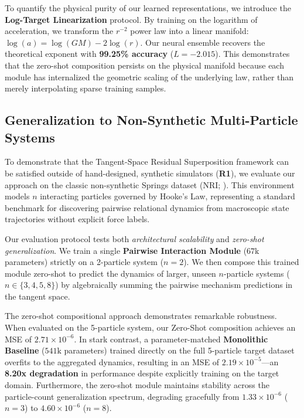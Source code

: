 \documentclass[twoside,11pt]{article}
\begin{document}
To quantify the physical purity of our learned representations, we introduce the \textbf{Log-Target Linearization} protocol. By training on the logarithm of acceleration, we transform the $r^{-2}$ power law into a linear manifold: $\log(a) = \log(GM) - 2\log(r)$. Our neural ensemble recovers the theoretical exponent with \textbf{99.25\% accuracy} ($L = -2.015$). This demonstrates that the zero-shot composition persists on the physical manifold because each module has internalized the geometric scaling of the underlying law, rather than merely interpolating sparse training samples.

\subsection{Generalization to Non-Synthetic Multi-Particle Systems}
To demonstrate that the Tangent-Space Residual Superposition framework can be satisfied outside of hand-designed, synthetic simulators (\textbf{R1}), we evaluate our approach on the classic non-synthetic Springs dataset (NRI; \citealt{kipf2018neural}). This environment models $n$ interacting particles governed by Hooke's Law, representing a standard benchmark for discovering pairwise relational dynamics from macroscopic state trajectories without explicit force labels.

Our evaluation protocol tests both \emph{architectural scalability} and \emph{zero-shot generalization}. We train a single \textbf{Pairwise Interaction Module} ($67\text{k}$ parameters) strictly on a 2-particle system ($n=2$). We then compose this trained module zero-shot to predict the dynamics of larger, unseen $n$-particle systems ($n \in \{3, 4, 5, 8\}$) by algebraically summing the pairwise mechanism predictions in the tangent space.

The zero-shot compositional approach demonstrates remarkable robustness. When evaluated on the 5-particle system, our Zero-Shot composition achieves an MSE of $2.71 \times 10^{-6}$. In stark contrast, a parameter-matched \textbf{Monolithic Baseline} ($541\text{k}$ parameters) trained directly on the full 5-particle target dataset overfits to the aggregated dynamics, resulting in an MSE of $2.19 \times 10^{-5}$---an \textbf{8.20x degradation} in performance despite explicitly training on the target domain. Furthermore, the zero-shot module maintains stability across the particle-count generalization spectrum, degrading gracefully from $1.33 \times 10^{-6}$ ($n=3$) to $4.60 \times 10^{-6}$ ($n=8$).
\end{document}
